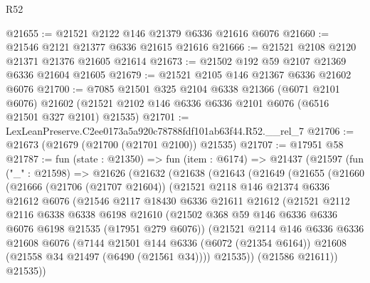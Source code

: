 \begin{lexlean}{R52}
\begin{coremodule}
@21655 := @21521 @2122 @146 @21379 @6336 @21616 @6076
@21660 := @21546 @2121 @21377 @6336 @21615 @21616
@21666 := @21521 @2108 @2120 @21371 @21376 @21605 @21614
@21673 := @21502 @192 @59 @2107 @21369 @6336 @21604 @21605
@21679 := @21521 @2105 @146 @21367 @6336 @21602 @6076
@21700 := @7085
    @21501
    @325
    @2104
    @6338
    @21366
    (@6071 @2101 @6076)
    @21602
    (@21521 @2102 @146 @6336 @6336 @2101 @6076 (@6516 @21501 @327 @2101) @21535)
@21701 := LexLeanPreserve.C2ee0173a5a920c78788fdf101ab63f44.R52.__rel_7
@21706 := @21673 (@21679 (@21700 (@21701 @2100)) @21535)
@21707 := @17951 @58
@21787 := fun (state : @21350) =>
  fun (item : @6174) =>
  @21437
    (@21597
      (fun ("_" : @21598) =>
      @21626
        (@21632
          (@21638
            (@21643
              (@21649
                (@21655
                  (@21660
                    (@21666
                      (@21706 (@21707 @21604))
                      (@21521
                        @2118
                        @146
                        @21374
                        @6336
                        @21612
                        @6076
                        (@21546
                          @2117
                          @18430
                          @6336
                          @21611
                          @21612
                          (@21521
                            @2112
                            @2116
                            @6338
                            @6338
                            @6198
                            @21610
                            (@21502
                              @368
                              @59
                              @146
                              @6336
                              @6336
                              @6076
                              @6198
                              @21535
                              (@17951 @279 @6076))
                            (@21521
                              @2114
                              @146
                              @6336
                              @6336
                              @21608
                              @6076
                              (@7144
                                @21501
                                @144
                                @6336
                                (@6072 (@21354 @6164))
                                @21608
                                (@21558 @34 @21497 (@6490 (@21561 @34))))
                              @21535))
                          (@21586 @21611))
                        @21535))

\end{coremodule}
\end{lexlean}
